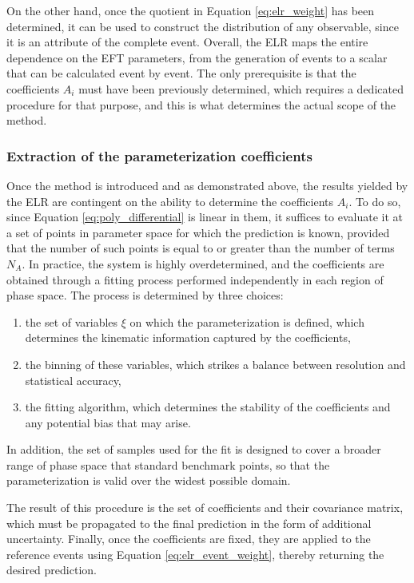 On the other hand, once the quotient in Equation \ref{eq:elr_weight} has been determined, it can be used to construct the distribution of any observable, since it is an attribute of the complete event. Overall, the ELR maps the entire dependence on the EFT parameters, from the generation of events to a scalar that can be calculated event by event. The only prerequisite is that the coefficients $A_i$ must have been previously determined, which requires a dedicated procedure for that purpose, and this is what determines the actual scope of the method.\\

\subsubsection{Extraction of the parameterization coefficients}
\label{subsec:ELR_coefficients}
%
Once the method is introduced and as demonstrated above, the results yielded by the ELR are contingent on the ability to determine the coefficients $A_i$. To do so, since Equation \ref{eq:poly_differential} is linear in them, it suffices to evaluate it at a set of points in parameter space for which the prediction is known, provided that the number of such points is equal to or greater than the number of terms $N_A$. In practice, the system is highly overdetermined, and the coefficients are obtained through a fitting process performed independently in each region of phase space. The process is determined by three choices:
\begin{enumerate}
    \item the set of variables $\xi$ on which the parameterization is defined, which determines the kinematic information captured by the coefficients,
    \item the binning of these variables, which strikes a balance between resolution and statistical accuracy,
    \item the fitting algorithm, which determines the stability of the coefficients and any potential bias that may arise.
\end{enumerate}
%
In addition, the set of samples used for the fit is designed to cover a broader range of phase space that standard benchmark points, so that the parameterization is valid over the widest possible domain.

The result of this procedure is the set of coefficients and their covariance matrix, which must be propagated to the final prediction in the form of additional uncertainty. Finally, once the coefficients are fixed, they are applied to the reference events using Equation \ref{eq:elr_event_weight}, thereby returning the desired prediction.\\


